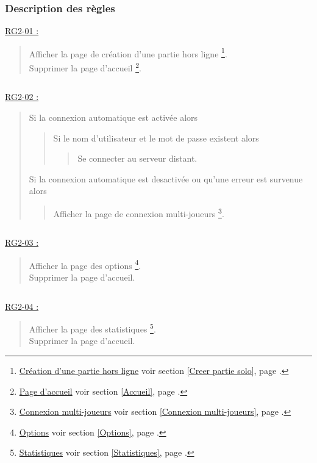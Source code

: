 \documentclass{report}
\begin{document}
\newpage

		\subsubsection{Description des règles}
		
		\underline{RG2-01 :}
			\begin{quote}
				Afficher la page de création d'une partie hors ligne
					\footnote{
						\hyperlink{Creer partie solo}{Création d'une partie hors ligne}
						\og voir section \ref{Creer partie solo}, page \pageref{Creer partie solo}.\fg
					}.\\
				Supprimer la page d'accueil%
					\footnote{
						\hyperlink{Page d'accueil}{Page d'accueil}
						\og voir section \ref{Accueil}, page \pageref{Accueil}.\fg
					}.
			\end{quote}

		$\,$

		\underline{RG2-02 :}
			\begin{quote}
				Si la connexion automatique est activée alors
				\begin{quote}
					Si le nom d'utilisateur et le mot de passe existent alors
					\begin{quote}
						Se connecter au serveur distant.
					\end{quote}	
				\end{quote}
				Si la connexion automatique est desactivée ou qu'une erreur est survenue alors 
				\begin{quote}		
					Afficher la page de connexion multi-joueurs%
						\footnote{
							\hyperlink{Connexion multi-joueurs}{Connexion multi-joueurs}
							\og voir section \ref{Connexion multi-joueurs}, page \pageref{Connexion multi-joueurs}.\fg
						}.
				\end{quote}
			\end{quote}

		$\,$
		
		\underline{RG2-03 :}
			\begin{quote}
				Afficher la page des options%
					\footnote{
						\hyperlink{Options}{Options}
						\og voir section \ref{Options}, page \pageref{Options}.\fg
					}.\\
				Supprimer la page d'accueil\footnotemark[2].
			\end{quote}


		$\,$

		\underline{RG2-04 :}
			\begin{quote}
				Afficher la page des statistiques%
					\footnote{
						\hyperlink{Statistiques}{Statistiques}
						\og voir section \ref{Statistiques}, page \pageref{Statistiques}.\fg
					}.\\
				Supprimer la page d'accueil\footnotemark[2].
			\end{quote}
\end{document}
